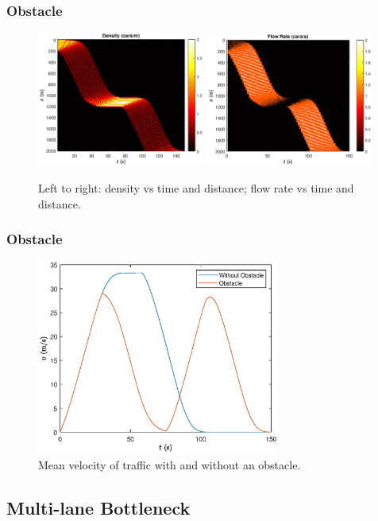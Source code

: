 \documentclass{beamer}
\begin{document}
\begin{frame}
  \frametitle{Obstacle}
  \begin{figure}[H]
    \includegraphics[width=5.5cm]{BottleNeck5.eps}
    \includegraphics[width=5.5cm]{BottleNeck6.eps}
    \caption{Left to right: density vs time and distance; flow rate vs time and distance.}
\end{figure}
\end{frame}

\begin{frame}
  \frametitle{Obstacle}
  \begin{figure}[H]
    \includegraphics[width=8cm]{BottleNeck7.eps}
    \caption{Mean velocity of traffic with and without an obstacle.}
  \end{figure}
\end{frame}


\subsection{Multi-lane Bottleneck}
\end{document}
